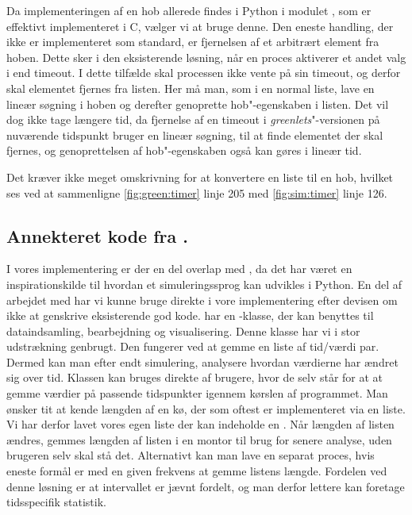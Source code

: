 Da implementeringen af en hob allerede findes i Python i modulet , som er effektivt implementeret i C, vælger vi at bruge denne. Den eneste handling,
der ikke er implementeret som standard, er fjernelsen af et arbitrært element fra hoben. Dette sker i den eksisterende løsning, når en proces
aktiverer et andet valg i  end timeout. I dette tilfælde skal
processen ikke vente på sin timeout, og derfor skal elementet fjernes fra  listen. Her må man, som i
en normal liste, lave en lineær søgning i hoben og derefter genoprette
hob"-egenskaben i listen. Det vil dog ikke tage længere tid, da fjernelse af en timeout i \emph{greenlets}"-versionen på nuværende
tidspunkt bruger en lineær søgning, til at finde elementet der skal
fjernes, og genoprettelsen af hob"-egenskaben også kan gøres i lineær tid.

Det kræver ikke meget omskrivning for at konvertere en liste til en hob, hvilket ses ved at sammenligne \cref{fig:green:timer} linje 205 med \cref{fig:sim:timer} linje 126. 

\subsection{Annekteret kode fra \simpy.}
I vores implementering er der en del overlap med \simpy, da det har været en inspirationskilde til hvordan et simuleringssprog kan udvikles i Python. En del af arbejdet med \simpy har vi kunne bruge direkte i vore implementering efter devisen om ikke at genskrive eksisterende god kode. \simpy har en -klasse, der kan benyttes til dataindsamling, bearbejdning og visualisering. Denne klasse har vi i stor udstrækning genbrugt. Den fungerer ved at gemme en liste af tid/værdi par. Dermed kan man efter endt simulering, analysere  hvordan værdierne har ændret sig over tid. Klassen  kan bruges direkte af brugere, hvor de selv  står for at at gemme værdier på passende tidspunkter igennem kørslen af programmet. Man ønsker tit at kende længden af en kø, der som oftest er implementeret via en liste. Vi har derfor lavet vores egen liste der kan indeholde en . Når længden af listen ændres, gemmes længden af listen i en montor til brug for senere analyse, uden brugeren selv skal stå det. Alternativt kan man lave en separat proces, hvis eneste formål er med en given frekvens at gemme listens længde. Fordelen ved denne løsning er at intervallet er jævnt fordelt, og man derfor lettere kan foretage tidsspecifik statistik.
